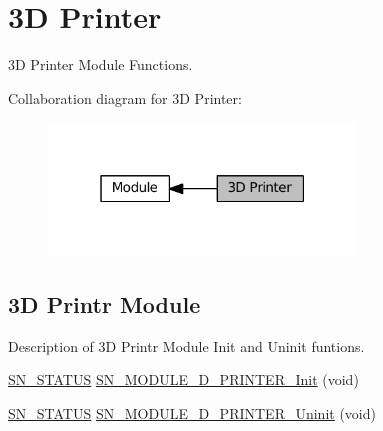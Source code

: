 \hypertarget{group__MODULE__3D__PRINTER}{}\section{3D Printer}
\label{group__MODULE__3D__PRINTER}


3D Printer Module Functions.  


Collaboration diagram for 3D Printer\+:\nopagebreak
\begin{figure}[H]
\begin{center}
\leavevmode
\includegraphics[width=232pt]{group__MODULE__3D__PRINTER}
\end{center}
\end{figure}
\subsection*{3D Printr Module}
\label{_amgrp31919ac2a63e9801f2c4fb221e60d48f}%
Description of 3D Printr Module Init and Uninit funtions. \begin{DoxyCompactItemize}
\item 
\hyperlink{group__SYSTEM__ERROR_ga4540713b9a7a18ce44d78c3a10f7442f}{S\+N\+\_\+\+S\+T\+A\+T\+US} \hyperlink{group__MODULE__3D__PRINTER_ga801e265ffe6f8c56081112f4fdd35f39}{S\+N\+\_\+\+M\+O\+D\+U\+L\+E\+\_\+D\+\_\+\+P\+R\+I\+N\+T\+E\+R\+\_\+\+Init} (void)
\item 
\hyperlink{group__SYSTEM__ERROR_ga4540713b9a7a18ce44d78c3a10f7442f}{S\+N\+\_\+\+S\+T\+A\+T\+US} \hyperlink{group__MODULE__3D__PRINTER_ga776f5e31b0c0e176e35669f9432baec0}{S\+N\+\_\+\+M\+O\+D\+U\+L\+E\+\_\+D\+\_\+\+P\+R\+I\+N\+T\+E\+R\+\_\+\+Uninit} (void)
\end{DoxyCompactItemize}
